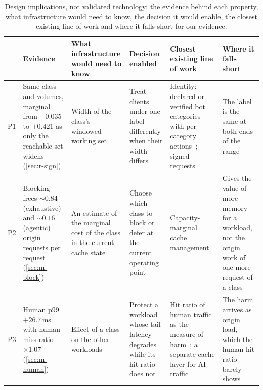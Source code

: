 \begin{table}[t]
\caption{Design implications, not validated technology: the evidence behind each property, what infrastructure would need to know, the decision it
would enable, the closest existing line of work and where it falls short for our evidence.}
\label{tab:bridge}
\centering\scriptsize
\renewcommand{\arraystretch}{1.15}
\begin{tabularx}{\textwidth}{@{}l>{\raggedright\arraybackslash}X
  >{\raggedright\arraybackslash}X>{\raggedright\arraybackslash}X
  >{\raggedright\arraybackslash}X>{\raggedright\arraybackslash}X@{}}
\toprule
 & Evidence & What infrastructure would need to know & Decision enabled &
   Closest existing line of work & Where it falls short \\
\midrule
P1 & Same class and volumes, marginal from $-0.035$ to $+0.421$ as only the reachable set
  widens (\cref{sec:r-sign}) &
  Width of the class's windowed working set &
  Treat clients under one label differently when their width differs &
  Identity: declared or verified bot categories with per-category
  actions~\cite{cloudflare2026options}; signed requests~\cite{ietf-webbotauth} &
  The label is the same at both ends of the range \\
\addlinespace
P2 & Blocking frees ${\sim}0.84$ (exhaustive) and ${\sim}0.16$ (agentic) origin
  requests per request (\cref{sec:m-block}) &
  An estimate of the marginal cost of the class in the current cache state &
  Choose which class to block or defer at the current operating point &
  Capacity-marginal cache management~\cite{qureshi2006ucp,cidon2016cliffhanger} &
  Gives the value of more memory for a workload, not the origin work of one more request
  of a class \\
\addlinespace
P3 & Human p99 $+26.7$\,ms with human miss ratio $\times 1.07$ (\cref{sec:m-human}) &
  Effect of a class on the other workloads &
  Protect a workload whose tail latency degrades while its hit ratio does not &
  Hit ratio of human traffic as the measure of harm~\cite{zhang2025,cloudflare2026cache};
  a separate cache layer for AI traffic~\cite{cloudflare2026cache} &
  The harm arrives as origin load, which the human hit ratio barely shows \\
\bottomrule
\end{tabularx}
\end{table}

